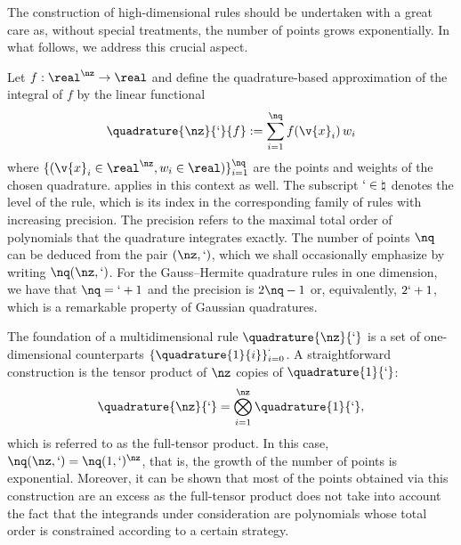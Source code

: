 The construction of high-dimensional rules should be undertaken with a great
care as, without special treatments, the number of points grows exponentially.
In what follows, we address this crucial aspect.

Let $f: \real^\nz \to \real$ and define the quadrature-based approximation of
the integral of $f$ by the linear functional
\[
  \quadrature{\nz}{\lq}{f} := \sum_{i = 1}^\nq f(\v{x}_i) \, w_i
\]
where $\{ (\v{x}_i \in \real^\nz, w_i \in \real) \}_{i = 1}^\nq$ are the points
and weights of the chosen quadrature.  applies in this
context as well. The subscript $\lq \in \natural$ denotes the level of the rule,
which is its index in the corresponding family of rules with increasing
precision. The precision refers to the maximal total order of polynomials that
the quadrature integrates exactly. The number of points $\nq$ can be deduced
from the pair $(\nz, \lq)$, which we shall occasionally emphasize by writing
$\nq(\nz, \lq)$. For the Gauss--Hermite quadrature rules in one dimension, we
have that $\nq = \lq + 1$ and the precision is $2 \nq - 1$ \cite{heiss2008} or,
equivalently, $2 \lq + 1$, which is a remarkable property of Gaussian
quadratures.

The foundation of a multidimensional rule $\quadrature{\nz}{\lq}$ is a set of
one-dimensional counterparts $\{ \quadrature{1}{i} \}_{i = 0}^\lq$. A
straightforward construction is the tensor product of $\nz$ copies of
$\quadrature{1}{\lq}$:
\[
  \quadrature{\nz}{\lq} = \bigotimes_{i = 1}^\nz \quadrature{1}{\lq},
\]
which is referred to as the full-tensor product. In this case, $\nq(\nz,
\lq) = \nq(1, \lq)^\nz$, that is, the growth of the number of points is
exponential. Moreover, it can be shown that most of the points obtained via this
construction are an excess as the full-tensor product does not take into account
the fact that the integrands under consideration are polynomials whose total
order is constrained according to a certain strategy.

